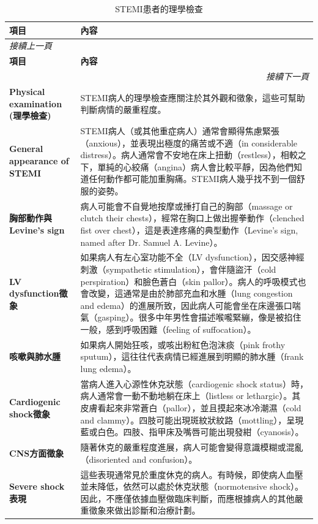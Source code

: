 \documentclass[fleqn,10pt,
paperheight=16cm, paperwidth=12cm,
includehead,%
nomarginpar,%
textwidth=10cm,%
headheight=25pt,%
]{wlscirep}
\begin{document}
\begin{longtable}{p{4cm} p{9cm}}
\caption{STEMI患者的理學檢查}\\
\hline
\textbf{項目} & \textbf{內容} \\
\hline
\endfirsthead
\multicolumn{2}{l}{\textit{接續上一頁}} \\
\hline
\textbf{項目} & \textbf{內容} \\
\hline
\endhead
\hline \multicolumn{2}{r}{\textit{接續下一頁}} \\
\endfoot
\endlastfoot

\textbf{Physical examination (理學檢查)} & STEMI病人的理學檢查應關注於其外觀和徵象，這些可幫助判斷病情的嚴重程度。 \\ \hline

\textbf{General appearance of STEMI} & STEMI病人（或其他重症病人）通常會顯得焦慮緊張（anxious），並表現出極度的痛苦或不適（in considerable distress）。病人通常會不安地在床上扭動（restless），相較之下，單純的心絞痛（angina）病人會比較平靜，因為他們知道任何動作都可能加重胸痛。STEMI病人幾乎找不到一個舒服的姿勢。 \\ \hline

\textbf{胸部動作與Levine's sign} & 病人可能會不自覺地按摩或捶打自己的胸部（massage or clutch their chests），經常在胸口上做出握拳動作（clenched fist over chest），這是表達疼痛的典型動作（Levine's sign, named after Dr. Samuel A. Levine）。 \\ \hline

\textbf{LV dysfunction徵象} & 如果病人有左心室功能不全（LV dysfunction），因交感神經刺激（sympathetic stimulation），會伴隨盜汗（cold perspiration）和臉色蒼白（skin pallor）。病人的呼吸模式也會改變，這通常是由於肺部充血和水腫（lung congestion and edema）的進展所致，因此病人可能會坐在床邊張口喘氣（gasping）。很多中年男性會描述喉嚨緊繃，像是被掐住一般，感到呼吸困難（feeling of suffocation）。 \\ \hline

\textbf{咳嗽與肺水腫} & 如果病人開始狂咳，或咳出粉紅色泡沫痰（pink frothy sputum），這往往代表病情已經進展到明顯的肺水腫（frank lung edema）。 \\ \hline

\textbf{Cardiogenic shock徵象} & 當病人進入心源性休克狀態（cardiogenic shock status）時，病人通常會一動不動地躺在床上（listless or lethargic）。其皮膚看起來非常蒼白（pallor），並且摸起來冰冷潮濕（cold and clammy）。四肢可能出現斑紋狀紋路（mottling），呈現藍或白色。四肢、指甲床及嘴唇可能出現發紺（cyanosis）。 \\ \hline

\textbf{CNS方面徵象} & 隨著休克的嚴重程度進展，病人可能會變得意識模糊或混亂（disoriented and confusion）。 \\ \hline

\textbf{Severe shock表現} & 這些表現通常見於重度休克的病人。有時候，即使病人血壓並未降低，依然可以處於休克狀態（normotensive shock）。因此，不應僅依據血壓做臨床判斷，而應根據病人的其他嚴重徵象來做出診斷和治療計劃。 \\ \hline

\end{longtable}
\end{document}
